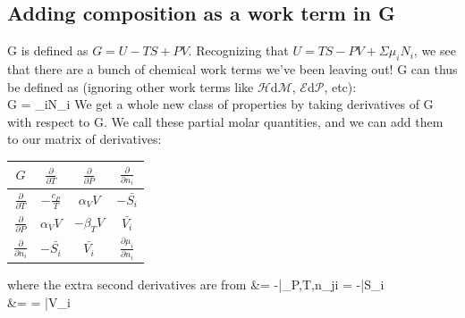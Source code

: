 \documentclass[12pt]{article}
\begin{document}
\subsection{Adding composition as a work term in G}
G is defined as $G = U-TS+PV$. Recognizing that $U = TS - PV + \Sigma \mu _iN_i$, we see that there are a bunch of chemical work terms we{'}ve been
leaving out! G can thus be defined as (ignoring other work terms like $\mathcal{H}$d$\mathcal{M}$, $\mathcal{E}$d$\mathcal{P}$, etc):\\
\eqs G = \Sigma \mu _iN_i\eqe
We get a whole new class of properties by taking derivatives of G with respect to G. We call these partial molar quantities, and we can add them to our matrix of derivatives:
\begin{center}
\begin{tabular}{c | c | c | c}
 $G$ & $\frac{\partial}{\partial T}$ & $\frac{\partial}{\partial P}$ & $\frac{\partial}{\partial n_i}$\\ \hline
 $\frac{\partial}{\partial T}$ & $-\frac{c_P}{T}$ & $\alpha_V V$ & $-\bar{S_i}$\\ \hline
 $\frac{\partial}{\partial P}$ & $\alpha_V V$ & $-\beta_T V$ & $\bar{V_i}$\\ \hline
 $\frac{\partial}{\partial n_i}$ & $-\bar{S_i}$ & $\bar{V_i}$ & $\frac{\partial \mu_i}{\partial n_i}$
\end{tabular}
\end{center}

where the extra second derivatives are from
\eqs
{} &= -|_{P,T,n_{j\neq i}} = -\bar{S_i}\\
 &= = \bar{V_i}
\eqe
\end{document}
